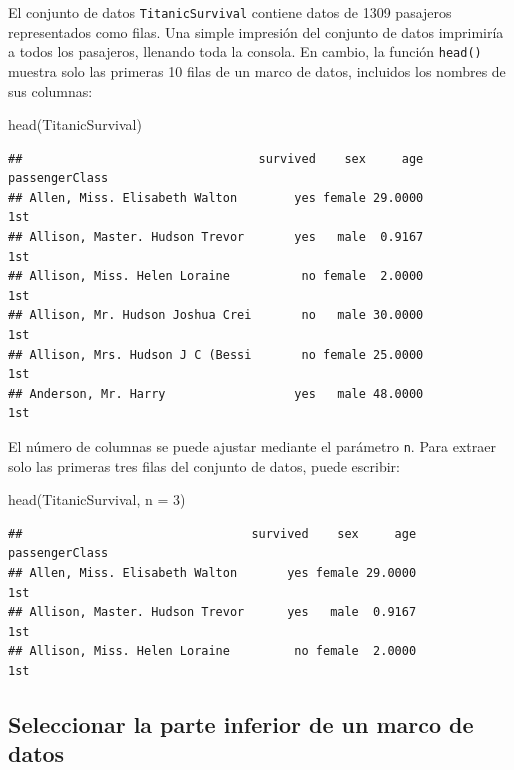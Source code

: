 \documentclass[
]{book}
\newenvironment{Shaded}{\begin{snugshade}}{\end{snugshade}}
\newcommand{\AttributeTok}[1]{\textcolor[rgb]{0.77,0.63,0.00}{#1}}
\newcommand{\DecValTok}[1]{\textcolor[rgb]{0.00,0.00,0.81}{#1}}
\newcommand{\FunctionTok}[1]{\textcolor[rgb]{0.00,0.00,0.00}{#1}}
\newcommand{\NormalTok}[1]{#1}
\begin{document}
El conjunto de datos \texttt{TitanicSurvival} contiene datos de 1309 pasajeros representados como filas. Una simple impresión del conjunto de datos imprimiría a todos los pasajeros, llenando toda la consola. En cambio, la función \texttt{head()} muestra solo las primeras 10 filas de un marco de datos, incluidos los nombres de sus columnas:

\begin{Shaded}
\begin{Highlighting}[]
\FunctionTok{head}\NormalTok{(TitanicSurvival)}
\end{Highlighting}
\end{Shaded}

\begin{verbatim}
##                                 survived    sex     age passengerClass
## Allen, Miss. Elisabeth Walton        yes female 29.0000            1st
## Allison, Master. Hudson Trevor       yes   male  0.9167            1st
## Allison, Miss. Helen Loraine          no female  2.0000            1st
## Allison, Mr. Hudson Joshua Crei       no   male 30.0000            1st
## Allison, Mrs. Hudson J C (Bessi       no female 25.0000            1st
## Anderson, Mr. Harry                  yes   male 48.0000            1st
\end{verbatim}

El número de columnas se puede ajustar mediante el parámetro \texttt{n}. Para extraer solo las primeras tres filas del conjunto de datos, puede escribir:

\begin{Shaded}
\begin{Highlighting}[]
\FunctionTok{head}\NormalTok{(TitanicSurvival, }\AttributeTok{n =} \DecValTok{3}\NormalTok{)}
\end{Highlighting}
\end{Shaded}

\begin{verbatim}
##                                survived    sex     age passengerClass
## Allen, Miss. Elisabeth Walton       yes female 29.0000            1st
## Allison, Master. Hudson Trevor      yes   male  0.9167            1st
## Allison, Miss. Helen Loraine         no female  2.0000            1st
\end{verbatim}

\hypertarget{seleccionar-la-parte-inferior-de-un-marco-de-datos}{%
\subsection{Seleccionar la parte inferior de un marco de datos}\label{seleccionar-la-parte-inferior-de-un-marco-de-datos}}
\end{document}
